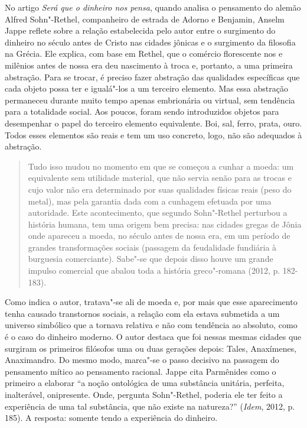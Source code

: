 No artigo \emph{Será que o dinheiro nos pensa}, quando analisa o
pensamento do alemão Alfred Sohn"-Rethel, companheiro de estrada de
Adorno e Benjamin, Anselm Jappe reflete sobre a relação estabelecida
pelo autor entre o surgimento do dinheiro no século  antes de Cristo
nas cidades jônicas e o surgimento da filosofia na Grécia. Ele explica,
com base em Rethel, que o comércio florescente nos  e  milênios
antes de nossa era deu nascimento à troca e, portanto, a uma primeira
abstração. Para se trocar, é preciso fazer abstração das qualidades
específicas que cada objeto possa ter e igualá"-los a um terceiro
elemento. Mas essa abstração permaneceu durante muito tempo apenas
embrionária ou virtual, sem tendência para a totalidade social. Aos
poucos, foram sendo introduzidos objetos para desempenhar o papel do
terceiro elemento equivalente. Boi, sal, ferro, prata, ouro. Todos esses
elementos são reais e tem um uso concreto, logo, não são adequados à
abstração.

\begin{quote}
Tudo isso mudou no momento em que se começou a cunhar a moeda: um
equivalente sem utilidade material, que não servia senão para as trocas
e cujo valor não era determinado por suas qualidades físicas reais (peso
do metal), mas pela garantia dada com a cunhagem efetuada por uma
autoridade. Este acontecimento, que segundo Sohn"-Rethel perturbou a
história humana, tem uma origem bem precisa: nas cidades gregas de Jônia
onde apareceu a moeda, no século  antes de nossa era, em um período
de grandes transformações sociais (passagem da feudalidade fundiária à
burguesia comerciante). Sabe"-se que depois disso houve um grande impulso
comercial que abalou toda a história greco"-romana (2012, p. 182-183).
\end{quote}

Como indica o autor, tratava"-se ali de moeda e, por mais que esse
aparecimento tenha causado transtornos sociais, a relação com ela estava
submetida a um universo simbólico que a tornava relativa e não com
tendência ao absoluto, como é o caso do dinheiro moderno. O autor
destaca que foi nessas mesmas cidades que surgiram os primeiros
filósofos uma ou duas gerações depois: Tales, Anaxímenes, Anaximandro.
Do mesmo modo, marca"-se o passo decisivo na passagem do pensamento
mítico ao pensamento racional. Jappe cita Parmênides como o primeiro a
elaborar ``a noção ontológica de uma substância unitária, perfeita,
inalterável, onipresente. Onde, pergunta Sohn"-Rethel, poderia ele ter
feito a experiência de uma tal substância, que não existe na natureza?''
(\emph{Idem}, 2012, p. 185). A resposta: somente tendo a experiência do
dinheiro.

